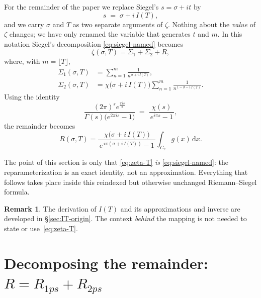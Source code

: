 \documentclass[11pt]{article}
\theoremstyle{definition}
\newtheorem{remark}[theorem]{Remark}
\begin{document}
For the remainder of the paper we replace Siegel's $s=\sigma+it$ by
\begin{equation}
s \;=\; \sigma + i\,I(T),
\end{equation}
and we carry $\sigma$ and $T$ as two separate arguments of $\zeta$. Nothing about
the \emph{value} of $\zeta$ changes; we have only renamed the variable that
generates $t$ and $m$. In this notation Siegel's decomposition
\eqref{eq:siegel-named} becomes
\begin{equation}\label{eq:zeta-T}
\zeta(\sigma,T)
=
\Sigma_{1} + \Sigma_{2} + R,
\end{equation}
where, with $m=\lfloor T\rfloor$,
\begin{align}
\Sigma_{1}(\sigma,T) &= \sum_{n=1}^{m}
\frac{1}{n^{\,\sigma + i\,I(T)}}, \\[4pt]
\Sigma_{2}(\sigma,T) &= \chi\!\bigl(\sigma + i\,I(T)\bigr)
\sum_{n=1}^{m}
\frac{1}{n^{\,1 - \sigma - i\,I(T)}} .
\end{align}
Using the identity
\begin{equation}
\frac{(2\pi)^s e^{\tfrac{\pi i s}{2}}}{\Gamma(s)\bigl(e^{2\pi i s}-1\bigr)}
\;=\;
\frac{\chi(s)}{\,e^{i\pi s}-1\,},
\end{equation}
the remainder becomes
\begin{equation}\label{eq:R-T}
R(\sigma,T)
=
\frac{\chi\!\bigl(\sigma + i\,I(T)\bigr)}{\,e^{\,i\pi (\sigma + i\,I(T))}-1\,}
\int_{C_2} g(x)\,\mathrm{d}x .
\end{equation}

The point of this section is only that \eqref{eq:zeta-T} \emph{is}
\eqref{eq:siegel-named}: the reparameterization is an exact identity, not an
approximation. Everything that follows takes place inside this reindexed but
otherwise unchanged Riemann--Siegel formula.

\begin{remark}
The derivation of $I(T)$ and its approximations and inverse are developed in
\S\ref{sec:IT-origin}. The context \emph{behind} the mapping is not needed to
state or use~\eqref{eq:zeta-T}.
\end{remark}

\section{Decomposing the remainder: \texorpdfstring{$R=R_{1ps}+R_{2ps}$}{R = R1ps + R2ps}}\label{sec:decomp}
\end{document}
